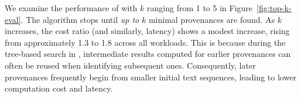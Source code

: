 \vspace{1pt}
We examine the performance of  with $k$ ranging from 1 to 5 in Figure~\ref{fig:top-k-eval}. 
 The algorithm stops until {\em up to} $k$ minimal provenances are found. %
As $k$ increases, the cost ratio (and similarly, latency) shows a modest increase, rising from approximately 1.3 to 1.8 across all workloads. This is because during the tree-based search in , intermediate results computed for earlier provenances can often be reused when identifying subsequent ones. Consequently, later provenances frequently begin from smaller initial text sequences, leading to lower computation cost and latency.   




